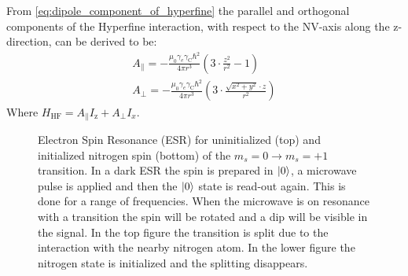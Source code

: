 From \cref{eq:dipole_component_of_hyperfine}  the parallel and orthogonal components of the Hyperfine interaction, with respect to the NV-axis along the z-direction, can be derived to be:
 \begin{align}
A_\parallel= - \frac{\mu_0 \gamma_e \gamma_{\mathrm{C}} \hbar^2 }{4 \pi r^3} \left(3\cdot \frac{z^2}{r^2}-1\right)\\
 A_\perp =  -\frac{\mu_0 \gamma_e \gamma_{\mathrm{C}} \hbar^2 }{4 \pi r^3}\left( 3\cdot\frac{\sqrt{x^2+y^2}\cdot z}{r^2}\right)
\end{align}
Where $H_{\mathrm{HF}} = A_\parallel I_\mathrm{z} + A_\perp I_x $.

\begin{figure}[htbp]
\centering
    \caption{ Electron Spin Resonance (ESR) for uninitialized (top) and initialized nitrogen spin (bottom) of the $m_s =0 \rightarrow m_s = +1$ transition. In a dark ESR the spin is prepared in ${\left\vert{0}\right\rangle}$, a microwave pulse is applied and then the ${\left\vert{0}\right\rangle}$ state is read-out again. This is done for a range of frequencies. When the microwave is on resonance with a transition the spin will be rotated and a dip will be visible in the signal. In the top figure the transition is split due to the interaction with the nearby nitrogen atom. In the lower figure the nitrogen state is initialized and the splitting disappears.}
    \label{fig:HF_split_levels}
\end{figure}

